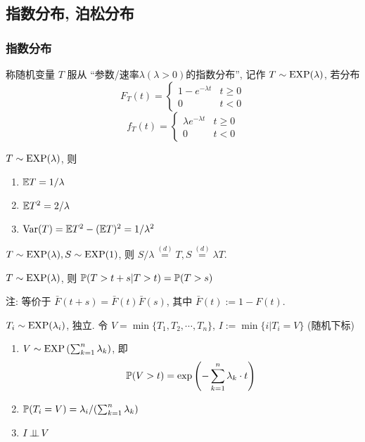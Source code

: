 \subsection{指数分布, 泊松分布}

\subsubsection{指数分布}

\begin{definition}[指数分布]
    称随机变量 $T$ 服从 ``参数/速率$\lambda(\lambda>0)$的指数分布'', 记作 $T\sim \operatorname{EXP}(\lambda)$, 若分布
    \begin{equation}
        F_T(t)=\begin{cases}
            1-e^{-\lambda t} & t\geq 0\\
            0 & t<0
        \end{cases}
    \end{equation}
    \begin{equation}
        f_T(t)=\begin{cases}
            \lambda e^{-\lambda t} & t\geq 0\\
            0 & t<0
        \end{cases}
    \end{equation}
\end{definition}

\begin{property}[矩]
$T\sim \operatorname{EXP}(\lambda)$, 则
\begin{enumerate}
    \item $\mathbb E T=1/\lambda$
    \item $\mathbb E T^2=2/\lambda$
    \item $\operatorname{Var}(T)=\mathbb E T^2-(\mathbb E T)^2=1/\lambda^2$
\end{enumerate}
\end{property}

\begin{property}[Scaling]
$T\sim \operatorname{EXP}(\lambda), S\sim \operatorname{EXP}(1)$, 则 $S/\lambda\overset{(d)}{=}T, S\overset{(d)}{=}\lambda T$.
\end{property}

\begin{property}[无记忆性]
$T\sim \operatorname{EXP}(\lambda)$, 则 $\mathbb{P}(T>t+s|T>t)=\mathbb{P}(T>s)$

注: 等价于 $\bar{F}(t+s)=\bar{F}(t)\bar{F}(s)$, 其中 $\bar{F}(t):=1-F(t)$.
\end{property}

\begin{property}[指数分布的排序]
$T_i\sim \operatorname{EXP}(\lambda_i)$, 独立. 令 $V=\min\{T_1,T_2,\cdots,T_n\}$, $I:=\min\{i|T_i=V\}$ (随机下标)
\begin{enumerate}
    \item $V\sim \operatorname{EXP}\left(\sum_{k=1}^n\lambda_k\right)$, 即
    \begin{equation}
		\mathbb{P}(V>t)=\exp\left(-\sum_{k=1}^n\lambda_k \cdot t\right)
		\end{equation}
    \item $\mathbb{P}(T_i=V)=\lambda_i/(\sum_{k=1}^n\lambda_k)$
    \item $I\operatorname{\perp\!\!\!\perp} V$
\end{enumerate}
\end{property}

